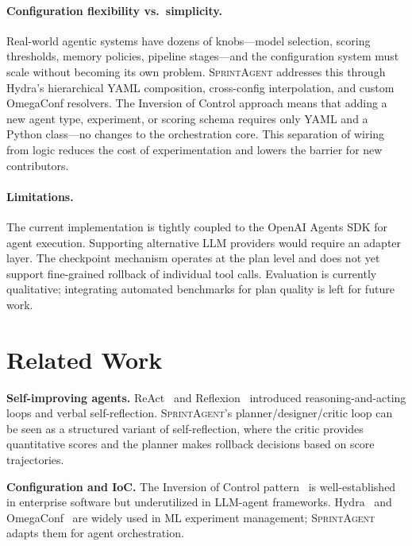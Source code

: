 \documentclass[11pt, a4paper]{article}
\newcommand{\sprintagent}{\textsc{SprintAgent}}
\newcommand{\ioc}{Inversion of Control}
\begin{document}
\paragraph{Configuration flexibility vs.\ simplicity.}
Real-world agentic systems have dozens of knobs---model selection,
scoring thresholds, memory policies, pipeline stages---and the
configuration system must scale without becoming its own problem.
\sprintagent{} addresses this through Hydra's hierarchical YAML
composition, cross-config interpolation, and custom OmegaConf resolvers.
The \ioc{} approach means that adding a new agent type, experiment, or
scoring schema requires only YAML and a Python class---no changes to the
orchestration core.  This separation of wiring from logic reduces the
cost of experimentation and lowers the barrier for new contributors.

\paragraph{Limitations.}
The current implementation is tightly coupled to the OpenAI Agents SDK
for agent execution.  Supporting alternative LLM providers would require
an adapter layer.  The checkpoint mechanism operates at the plan level
and does not yet support fine-grained rollback of individual tool calls.
Evaluation is currently qualitative; integrating automated benchmarks
for plan quality is left for future work.

\section{Related Work}
\label{sec:related}

\textbf{Self-improving agents.}
ReAct~\cite{yao2023react} and Reflexion~\cite{shinn2023reflexion}
introduced reasoning-and-acting loops and verbal self-reflection.
\sprintagent{}'s planner/designer/critic loop can be seen as a
structured variant of self-reflection, where the critic provides
quantitative scores and the planner makes rollback decisions based on
score trajectories.

\textbf{Configuration and IoC.}
The \ioc{} pattern~\cite{fowler2004ioc} is well-established in
enterprise software but underutilized in LLM-agent frameworks.
Hydra~\cite{hydra2019} and OmegaConf~\cite{omegaconf2019} are widely
used in ML experiment management; \sprintagent{} adapts them for agent
orchestration.

\end{document}
